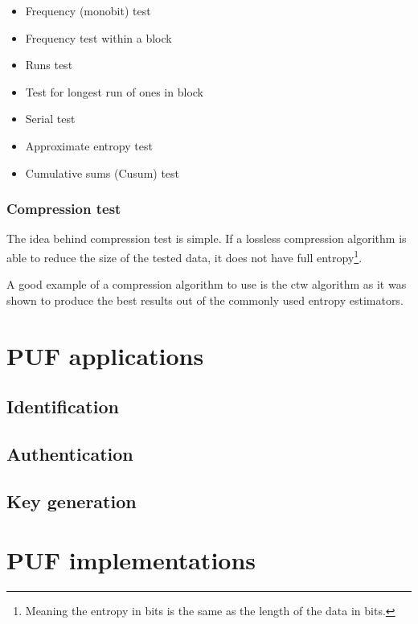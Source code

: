 \begin{itemize}
    \item Frequency (monobit) test
    \item Frequency test within a block
    \item Runs test
    \item Test for longest run of ones in block
    \item Serial test
    \item Approximate entropy test
    \item Cumulative sums (Cusum) test
\end{itemize}

\subsubsection*{Compression test}

The idea behind compression test is simple. If a lossless compression algorithm is able to reduce the size of the tested data, it does not have full entropy\footnote{Meaning the entropy in bits is the same as the length of the data in bits.}\cite{Leest2010}.

A good example of a compression algorithm to use is the \gls{ctw} algorithm as it was shown to produce the best results out of the commonly used entropy estimators\cite{Yun2008}.

\section{PUF applications}\label{sec:puf_applications}

\subsection{Identification}\label{sec:identification}
\subsection{Authentication}
\subsection{Key generation}

\section{PUF implementations}

